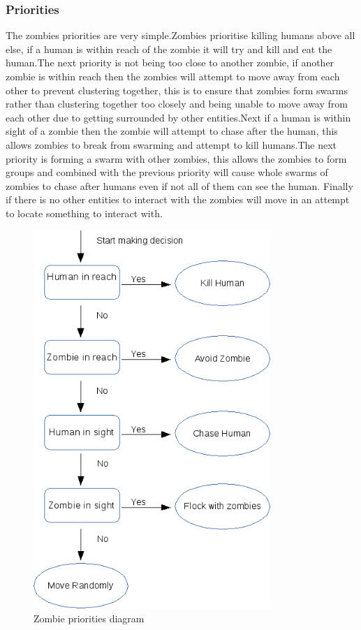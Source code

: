 \subsubsection{Priorities}
The zombies priorities are very simple.Zombies prioritise killing humans above all else, if a human is within reach of the zombie it will try and kill and eat the human.The next priority is not being too close to another zombie, if another zombie is within reach then the zombies will attempt to move away from each other to prevent clustering together, this is to ensure that zombies form swarms rather than clustering together too closely and being unable to move away from each other due to getting surrounded by other entities.Next if a human is within sight of a zombie then the zombie will attempt to chase after the human, this allows zombies to break from swarming and attempt to kill humans.The next priority is forming a swarm with other zombies, this allows the zombies to form groups and combined with the previous priority will cause whole swarms of zombies to chase after humans even if not all of them can see the human. Finally if there is no other entities to interact with the zombies will move in an attempt to locate something to interact with.
\begin{figure}[h]
  \centering
  \includegraphics[width=0.8\textwidth]{img/zombie_decision_tree.png}
\caption{Zombie priorities diagram}
    \label{fig:Zombie priorities diagram}
\end{figure}

